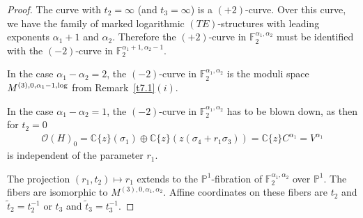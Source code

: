 \documentclass[10pt,a4paper]{amsart}
\numberwithin{equation}{section}
\numberwithin{figure}{section}
\newcommand{\C}{{\mathbb C}}
\renewcommand{\P}{{\mathbb P}}
\newcommand{\F}{{\mathbb F}}
\newcommand{\OO}{{\mathcal O}}
\newcommand{\www}{\widetilde}
\begin{document}
\begin{proof}
The curve with $t_2=\infty$ (and $t_3=\infty$)
is a $(+2)$-curve.
Over this curve, we have the family of marked logarithmic
$(TE)$-structures with
leading exponents $\alpha_1+1$ and $\alpha_2$.
Therefore the $(+2)$-curve in $\F_2^{\alpha_1,\alpha_2}$
must be identified with the $(-2)$-curve in
$\F_2^{\alpha_1+1,\alpha_2-1}$.

In the case $\alpha_1-\alpha_2=2$, the $(-2)$-curve
in $\F_2^{\alpha_1,\alpha_2}$ is the moduli space
$M^{(3),0,\alpha_1-1,{\rm log}}$ from Remark~\ref{t7.1}$(i)$.

In the case $\alpha_1-\alpha_2=1$, the $(-2)$-curve
in $\F_2^{\alpha_1,\alpha_2}$ has to be blown down,
as then for $t_2=0$
\begin{gather*}
\OO(H)_0=\C\{z\}(\sigma_1)\oplus\C\{z\}(z(\sigma_4+r_1\sigma_3))
=\C\{z\}C^{\alpha_1}=V^{\alpha_1}
\end{gather*}
is independent of the parameter $r_1$.

The projection $(r_1,t_2)\mapsto r_1$ extends
to the $\P^1$-fibration of $\F_2^{\alpha_1,\alpha_2}$
over $\P^1$.
The fibers are isomorphic to $M^{(3),0,\alpha_1,\alpha_2}$.
Affine coordinates on these fibers are $t_2$
and $\www t_2=t_2^{-1}$ or $t_3$ and $\www t_3=t_3^{-1}$.
\end{proof}
\end{document}
